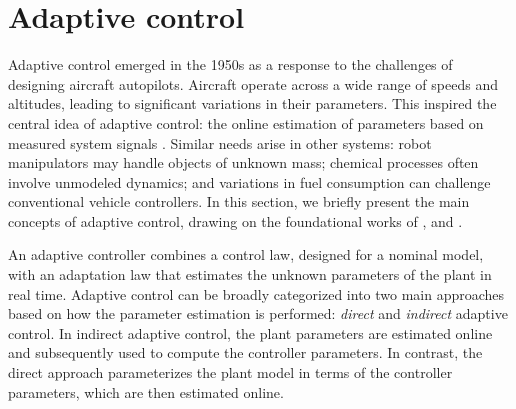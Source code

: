 \section{Adaptive control}\label{sec:background-adaptive-control}
Adaptive control emerged in the 1950s as a response to the challenges of designing aircraft autopilots. Aircraft operate across a wide range of speeds and altitudes, leading to significant variations in their parameters. This inspired the central idea of adaptive control: the online estimation of parameters based on measured system signals \citep{Slotine1991}. Similar needs arise in other systems: robot manipulators may handle objects of unknown mass; chemical processes often involve unmodeled dynamics; and variations in fuel consumption can challenge conventional vehicle controllers. In this section, we briefly present the main concepts of adaptive control, drawing on the foundational works of \citet{Slotine1991}, \citet{Krstic1995} and \citet{Ioannou2012}.

An adaptive controller combines a control law, designed for a nominal model, with an adaptation law that estimates the unknown parameters of the plant in real time. Adaptive control can be broadly categorized into two main approaches based on how the parameter estimation is performed: \emph{direct} and \emph{indirect} adaptive control. In indirect adaptive control, the plant parameters are estimated online and subsequently used to compute the controller parameters. In contrast, the direct approach parameterizes the plant model in terms of the controller parameters, which are then estimated online.

